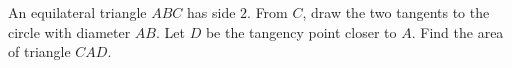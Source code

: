 An equilateral triangle $ABC$ has side $2$. From $C$, draw the two tangents to the circle with diameter $AB$. Let $D$ be the tangency point closer to $A$. Find the area of triangle $CAD$.
